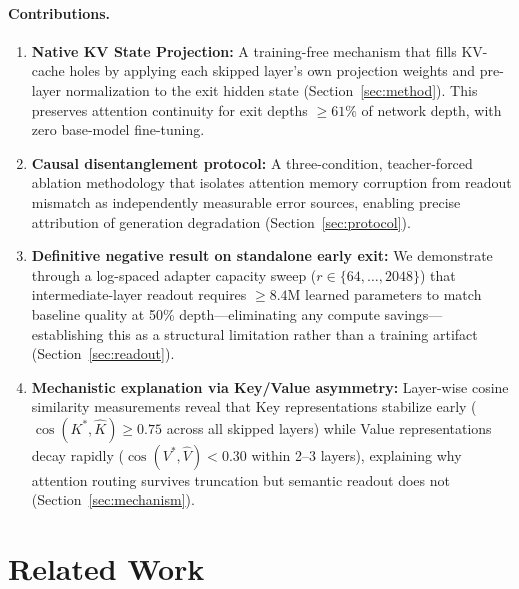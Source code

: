 \documentclass{article}
\newcommand{\Khat}{\hat{K}}
\newcommand{\Vhat}{\hat{V}}
\begin{document}
\paragraph{Contributions.}
\begin{enumerate}[nosep,leftmargin=*]
    \item \textbf{Native KV State Projection:} A training-free mechanism that fills KV-cache holes by applying each skipped layer's own projection weights and pre-layer normalization to the exit hidden state (Section~\ref{sec:method}). This preserves attention continuity for exit depths $\ge 61\%$ of network depth, with zero base-model fine-tuning.
    
    \item \textbf{Causal disentanglement protocol:} A three-condition, teacher-forced ablation methodology that isolates attention memory corruption from readout mismatch as independently measurable error sources, enabling precise attribution of generation degradation (Section~\ref{sec:protocol}).
    
    \item \textbf{Definitive negative result on standalone early exit:} We demonstrate through a log-spaced adapter capacity sweep ($r \in \{64, \ldots, 2048\}$) that intermediate-layer readout requires $\ge 8.4$M learned parameters to match baseline quality at 50\% depth---eliminating any compute savings---establishing this as a structural limitation rather than a training artifact (Section~\ref{sec:readout}).
    
    \item \textbf{Mechanistic explanation via Key/Value asymmetry:} Layer-wise cosine similarity measurements reveal that Key representations stabilize early ($\cos(K^*, \Khat) \ge 0.75$ across all skipped layers) while Value representations decay rapidly ($\cos(V^*, \Vhat) < 0.30$ within 2--3 layers), explaining why attention routing survives truncation but semantic readout does not (Section~\ref{sec:mechanism}).
\end{enumerate}

\section{Related Work}
\label{sec:related}
\end{document}
